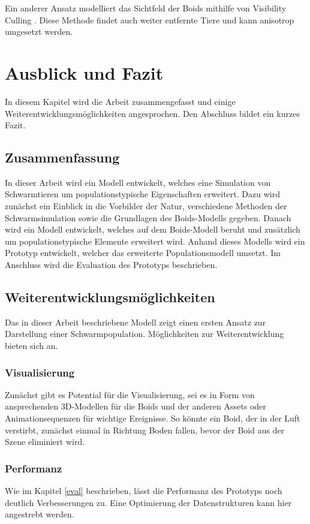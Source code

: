 \documentclass[draft=false
              ,paper=a4
              ,twoside=false
              ,fontsize=11pt
              ,headsepline
              ,BCOR10mm
              ,DIV11
              ,bibtotoc
              ,liststotoc
              ]{scrbook}
\begin{document}
Ein anderer Ansatz modelliert das Sichtfeld der Boids mithilfe von Visibility Culling \cite{journals/cie/SilvaLC09}. Diese Methode findet auch weiter entfernte Tiere und kann anisotrop umgesetzt werden. 

\chapter{Ausblick und Fazit}\label{fazit}
In diesem Kapitel wird die Arbeit zusammengefasst und einige Weiterentwicklungsmöglichkeiten angesprochen. Den Abschluss bildet ein kurzes Fazit.
\section{Zusammenfassung}
In dieser Arbeit wird ein Modell entwickelt, welches eine Simulation von Schwarmtieren um populationstypische Eigenschaften erweitert. Dazu wird zunächst ein Einblick in die Vorbilder der Natur, verschiedene Methoden der Schwarmsimulation sowie die Grundlagen des Boids-Modells gegeben. Danach wird ein Modell entwickelt, welches auf dem Boids-Modell beruht und zusätzlich um populationstypische Elemente erweitert wird. Anhand dieses Modells wird ein Prototyp entwickelt, welcher das erweiterte Populationsmodell umsetzt. Im Anschluss wird die Evaluation des Prototyps beschrieben.
\section{Weiterentwicklungsmöglichkeiten}
Das in dieser Arbeit beschriebene Modell zeigt einen ersten Ansatz zur Darstellung einer Schwarmpopulation. Möglichkeiten zur Weiterentwicklung bieten sich an.
\subsection{Visualisierung}
Zunächst gibt es Potential für die Visualisierung, sei es in Form von ansprechenden 3D-Modellen für die Boids und der anderen Assets oder Animationsequenzen für wichtige Ereignisse. So könnte ein Boid, der in der Luft verstirbt, zunächst einmal in Richtung Boden fallen, bevor der Boid aus der Szene eliminiert wird.

\subsection{Performanz}
Wie im Kapitel \ref{eval} beschrieben, lässt die Performanz des Prototyps noch deutlich Verbesserungen zu. Eine Optimierung der Datenstrukturen kann hier angestrebt werden.
\end{document}
